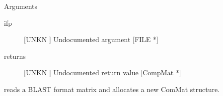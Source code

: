 Arguments
\begin{description}
\item[ifp] [UNKN ] Undocumented argument [FILE *]
\item[returns] [UNKN ] Undocumented return value [CompMat *]
\end{description}
reads a BLAST format matrix and
allocates a new ComMat structure.


